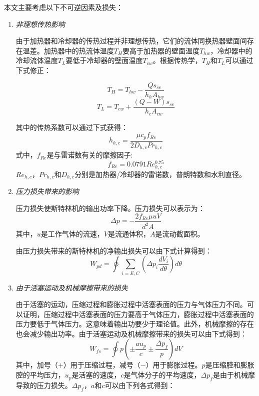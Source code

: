 本文主要考虑以下不可逆因素及损失：
\begin{enumerate}[label=(\arabic*)]
\item \emph{非理想传热影响}

\setlength\parindent{2em}
由于加热器和冷却器的传热过程并非理想传热，它们的流体同换热器壁面间存在温差。加热器中的热流体温度$T_{H}$要高于加热器的壁面温度$T_{hw}$，冷却器中的冷却流体温度$T_L$要低于冷却器的壁面温度$T_{cw}$。根据传热学，$T_{H}$和$T_{L}$可以通过下式修正：

\begin{equation}
	T_H = T_{hw} - \frac{Qs_{se}}{h_hA_{hw}}
	\label{eq:T_H}
\end{equation}
\begin{equation}
	T_L = T_{cw} + \frac{(Q-W)s_{se}}{h_cA_{cw}}
	\label{eq:T_L}
\end{equation}

其中的传热系数可以通过下式获得\cite{Babaelahi2015}：
\begin{equation}
	h_{h,c} = \frac{\mu c_pf_{Re}}{2D_{h,c}Pr_{h,c}}
\end{equation}
式中，$f_{Re}$是与雷诺数有关的摩擦因子:
\begin{equation}
	f_{Re} = 0.0791Re_{h,c}^{0.75}
\end{equation}
$Re_{h,c}$，$Pr_{h,c}$和$D_{h,c}$分别是加热器/冷却器的雷诺数，普朗特数和水利直径。

\item \emph{压力损失带来的影响}

压力损失使斯特林机的输出功率下降。压力损失可以表示为\cite{Urieli1984}：
\begin{equation}
	\Delta p = -\frac{2f_{Re}\mu u V}{d^2A}
\end{equation}
其中，$u$是工作气体的流速，$V$是流通体积，$A$是流动截面积。

由压力损失带来的斯特林机的净输出损失可以由下式计算得到：
\begin{equation}
	W_{pd} = \oint\underset{i = E,C}{\sum}(\Delta p_{i}\frac{dV_i}{d\theta})d\theta
\end{equation}

\item \emph{由于活塞运动及机械摩擦带来的损失}

由于活塞的运动，压缩过程和膨胀过程中活塞表面的压力与气体压力不同。可以证明，压缩过程中活塞表面的压力要高于气体压力，膨胀过程中活塞表面的压力要低于气体压力。这意味着输出功要少于理论值。此外，机械摩擦的存在也会减少输出功率。由于活塞运动及机械摩擦带来的损失可以由下式得到\cite{Babaelahi2015}：
\begin{equation}
	W_{fs} = \oint p(\pm\frac{au_p}{c}\pm\frac{\Delta p_f}{p})dV
\end{equation}
其中，加号（$+$）用于压缩过程，减号（$-$）用于膨胀过程。$p$是压缩腔和膨胀腔的平均压力，$u_p$是活塞的速度，$c$是气体分子的平均速度，$\Delta p_f$是由于机械摩导致的压力损失。$\Delta p_f$，$a$和$c$可以由下列各式得到\cite{Heywood1988}：


\end{enumerate}
